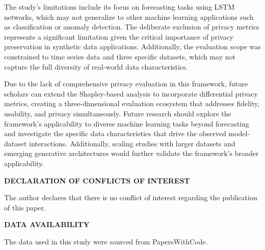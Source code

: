 \documentclass{article}
\begin{document}
The study's limitations include its focus on forecasting tasks using LSTM networks, which may not generalize to other machine learning applications such as classification or anomaly detection. The deliberate exclusion of privacy metrics represents a significant limitation given the critical importance of privacy preservation in synthetic data applications. Additionally, the evaluation scope was constrained to time series data and three specific datasets, which may not capture the full diversity of real-world data characteristics.

Due to the lack of comprehensive privacy evaluation in this framework, future scholars can extend the Shapley-based analysis to incorporate differential privacy metrics, creating a three-dimensional evaluation ecosystem that addresses fidelity, usability, and privacy simultaneously. Future research should explore the framework's applicability to diverse machine learning tasks beyond forecasting and investigate the specific data characteristics that drive the observed model-dataset interactions. Additionally, scaling studies with larger datasets and emerging generative architectures would further validate the framework's broader applicability.



\newpage

\begin{center}
\Large\textbf{DECLARATION OF CONFLICTS OF INTEREST}
\end{center}

\vspace{1em} %

The author declares that there is no conflict of interest regarding the publication of this paper.

\newpage

\begin{center}
\Large\textbf{DATA AVAILABILITY}
\end{center}

\vspace{1em} %

The data used in this study were sourced from PapersWithCode.


\newpage
\printbibliography
\end{document}
